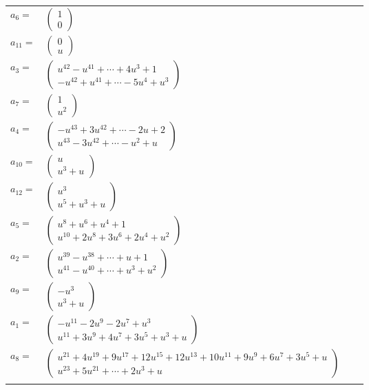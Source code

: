 \documentclass[1p]{elsarticle_modified}
\theoremstyle{definition}
\begin{document}
\begin{tabular}{m{7pt} m{180pt} m{7pt} m{180pt} }
\flushright $a_{6}=$&$\begin{pmatrix}1\\0\end{pmatrix}$ \\
\flushright $a_{11}=$&$\begin{pmatrix}0\\u\end{pmatrix}$ \\
\flushright $a_{3}=$&$\begin{pmatrix}u^{42}- u^{41}+\cdots+4 u^3+1\\- u^{42}+u^{41}+\cdots-5 u^4+u^3\end{pmatrix}$ \\
\flushright $a_{7}=$&$\begin{pmatrix}1\\u^2\end{pmatrix}$ \\
\flushright $a_{4}=$&$\begin{pmatrix}- u^{43}+3 u^{42}+\cdots-2 u+2\\u^{43}-3 u^{42}+\cdots- u^2+u\end{pmatrix}$ \\
\flushright $a_{10}=$&$\begin{pmatrix}u\\u^3+u\end{pmatrix}$ \\
\flushright $a_{12}=$&$\begin{pmatrix}u^3\\u^5+u^3+u\end{pmatrix}$ \\
\flushright $a_{5}=$&$\begin{pmatrix}u^8+u^6+u^4+1\\u^{10}+2 u^8+3 u^6+2 u^4+u^2\end{pmatrix}$ \\
\flushright $a_{2}=$&$\begin{pmatrix}u^{39}- u^{38}+\cdots+u+1\\u^{41}- u^{40}+\cdots+u^3+u^2\end{pmatrix}$ \\
\flushright $a_{9}=$&$\begin{pmatrix}- u^3\\u^3+u\end{pmatrix}$ \\
\flushright $a_{1}=$&$\begin{pmatrix}- u^{11}-2 u^9-2 u^7+u^3\\u^{11}+3 u^9+4 u^7+3 u^5+u^3+u\end{pmatrix}$ \\
\flushright $a_{8}=$&$\begin{pmatrix}u^{21}+4 u^{19}+9 u^{17}+12 u^{15}+12 u^{13}+10 u^{11}+9 u^9+6 u^7+3 u^5+u\\u^{23}+5 u^{21}+\cdots+2 u^3+u\end{pmatrix}$\\&\end{tabular}
\end{document}
